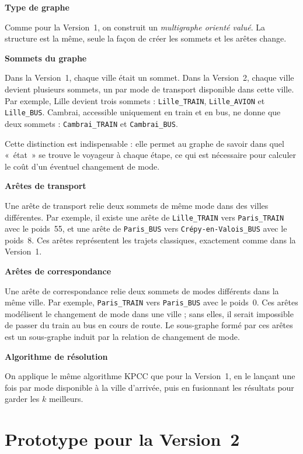 \documentclass[fontsize=10pt,oneside,parskip=half]{scrreprt}
\newcommand{\ic}[1]{{\setlength{\fboxsep}{2pt}\colorbox{BeigeSerein}{\texttt{#1}}}}
\begin{document}
\noindent\textbf{Type de graphe}

Comme pour la Version~1, on construit un \emph{multigraphe orienté valué}. La structure
est la même, seule la façon de créer les sommets et les arêtes change.

\noindent\textbf{Sommets du graphe}

Dans la Version~1, chaque ville était un sommet. Dans la Version~2, chaque ville devient
plusieurs sommets, un par mode de transport disponible dans cette ville. Par exemple,
Lille devient trois sommets : \ic{Lille\_TRAIN}, \ic{Lille\_AVION} et \ic{Lille\_BUS}.
Cambrai, accessible uniquement en train et en bus, ne donne que deux sommets :
\ic{Cambrai\_TRAIN} et \ic{Cambrai\_BUS}.

Cette distinction est indispensable : elle permet au graphe de savoir dans quel
«~état~» se trouve le voyageur à chaque étape, ce qui est nécessaire pour calculer le
coût d'un éventuel changement de mode.

\noindent\textbf{Arêtes de transport}

Une arête de transport relie deux sommets de même mode dans des villes différentes.
Par exemple, il existe une arête de \ic{Lille\_TRAIN} vers \ic{Paris\_TRAIN} avec le
poids~55, et une arête de \ic{Paris\_BUS} vers \ic{Crépy-en-Valois\_BUS} avec le
poids~8. Ces arêtes représentent les trajets classiques, exactement comme dans la
Version~1.

\noindent\textbf{Arêtes de correspondance}

Une arête de correspondance relie deux sommets de modes différents dans la même ville.
Par exemple, \ic{Paris\_TRAIN} vers \ic{Paris\_BUS} avec le poids~0. Ces arêtes
modélisent le changement de mode dans une ville ; sans elles, il serait impossible de
passer du train au bus en cours de route. Le sous-graphe formé par ces arêtes est un
sous-graphe induit par la relation de changement de mode.

\noindent\textbf{Algorithme de résolution}

On applique le même algorithme KPCC que pour la Version~1, en le lançant une fois par
mode disponible à la ville d'arrivée, puis en fusionnant les résultats pour garder les
$k$ meilleurs.

\section{Prototype pour la Version~2}
\end{document}
